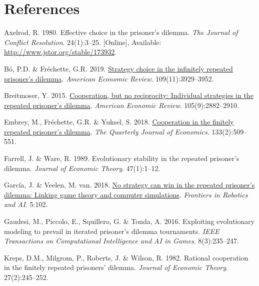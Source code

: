 \documentclass[11pt,preprint]{elsarticle}
\numberwithin{equation}{section}
\numberwithin{figure}{section}
\numberwithin{table}{section}
\newlength{\cslhangindent}
\newenvironment{CSLReferences}[2] %
{\begin{list}{}{%
	\setlength{\itemindent}{0pt}
	\setlength{\leftmargin}{0pt}
	\setlength{\parsep}{0pt}
	\ifodd #1
	\setlength{\leftmargin}{\cslhangindent}
	\setlength{\itemindent}{-1\cslhangindent}
	\fi
	\setlength{\itemsep}{#2\baselineskip}}}
{\end{list}}
\begin{document}
\newpage

\section*{References}\label{references}

\label{refs}
\begin{CSLReferences}{1}{1}
Axelrod, R. 1980. Effective choice in the prisoner's dilemma. \emph{The
Journal of Conflict Resolution}. 24(1):3--25. {[}Online{]}, Available:
\url{http://www.jstor.org/stable/173932}.

Bó, P.D. \& Fréchette, G.R. 2019.
\href{https://doi.org/10.1257/aer.20181480}{Strategy choice in the
infinitely repeated prisoner's dilemma}. \emph{American Economic
Review}. 109(11):3929--3952.

Breitmoser, Y. 2015.
\href{https://doi.org/10.1257/aer.20130675}{Cooperation, but no
reciprocity: Individual strategies in the repeated prisoner's dilemma}.
\emph{American Economic Review}. 105(9):2882--2910.

Embrey, M., Fréchette, G.R. \& Yuksel, S. 2018.
\href{https://doi.org/10.1093/qje/qjx033}{Cooperation in the finitely
repeated prisoner's dilemma}. \emph{The Quarterly Journal of Economics}.
133(2):509--551.

Farrell, J. \& Ware, R. 1989. Evolutionary stability in the repeated
prisoner's dilemma. \emph{Journal of Economic Theory}. 47(1):1--12.

García, J. \& Veelen, M. van. 2018.
\href{https://doi.org/10.3389/frobt.2018.00102}{No strategy can win in
the repeated prisoner's dilemma: Linking game theory and computer
simulations}. \emph{Frontiers in Robotics and AI}. 5:102.

Gaudesi, M., Piccolo, E., Squillero, G. \& Tonda, A. 2016. Exploiting
evolutionary modeling to prevail in iterated prisoner's dilemma
tournaments. \emph{IEEE Transactions on Computational Intelligence and
AI in Games}. 8(3):235--247.

Kreps, D.M., Milgrom, P., Roberts, J. \& Wilson, R. 1982. Rational
cooperation in the finitely repeated prisoners' dilemma. \emph{Journal
of Economic Theory}. 27(2):245--252.


\end{CSLReferences}
\end{document}
